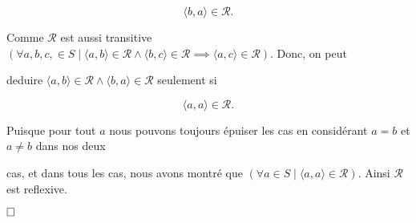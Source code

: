 \documentclass{article}
\begin{document}
$$\langle b,a \rangle \in \mathcal{R}.$$

Comme $\mathcal{R}$ est aussi transitive $ ( \forall a, b, c, \in S \mid \langle a,b \rangle \in \mathcal{R} \land \langle b,c \rangle \in \mathcal{R} \implies \langle a,c \rangle \in \mathcal{R} )$. Donc, on peut 

deduire $\langle a,b \rangle \in \mathcal{R} \land \langle b,a \rangle \in \mathcal{R}$ seulement si

$$\langle a,a \rangle \in \mathcal{R}.$$

Puisque pour tout $ a $ nous pouvons toujours épuiser les cas en considérant $a = b$ et $a \neq b$ dans nos deux 

cas, et dans tous les cas, nous avons montré que $( \forall a \in S \mid \langle a,a \rangle \in \mathcal{R} ) $. Ainsi $ \mathcal{R}$ est reflexive.

$\hfill \square$
\end{document}
